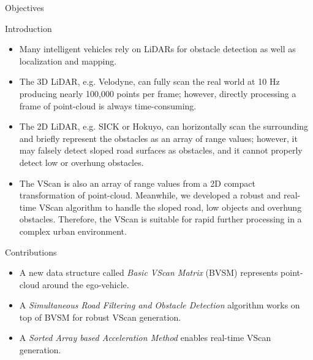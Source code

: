 \documentclass[final,hyperref={pdfpagelabels=false}]{beamer}
\begin{document}
\begin{frame}[t]
\begin{columns}[t]
\begin{column}{0.47\textwidth}
\begin{block}{Objectives}
\end{block}

            
\begin{block}{Introduction}

\begin{itemize}
\item Many intelligent vehicles rely on LiDARs for obstacle detection as well as localization and mapping.
\item The 3D LiDAR, e.g. Velodyne, can fully scan the real world at 10 Hz producing nearly 100,000 points per frame; however, directly processing a frame of point-cloud is always time-consuming.
\item The 2D LiDAR, e.g. SICK or Hokuyo, can horizontally scan the surrounding and briefly represent the obstacles as an array of range values; however, it may falsely detect sloped road surfaces as obstacles, and it cannot properly detect low or overhung obstacles.
\item The VScan is also an array of range values from a 2D compact transformation of point-cloud. Meanwhile, we developed a robust and real-time VScan algorithm to handle the sloped road, low objects and overhung obstacles. Therefore, the VScan is suitable for rapid further processing in a complex urban environment.
\end{itemize}

\end{block}

\begin{block}{Contributions}

\begin{itemize}
	\item A new data structure called \textit{Basic VScan Matrix} (BVSM) represents point-cloud around the ego-vehicle.
	\item A \textit{Simultaneous Road Filtering and Obstacle Detection} algorithm works on top of BVSM for robust VScan generation.
	\item A \textit{Sorted Array based Acceleration Method} enables real-time VScan generation.
\end{itemize}

\end{block}



\end{column}
\end{columns}
\end{frame}
\end{document}
